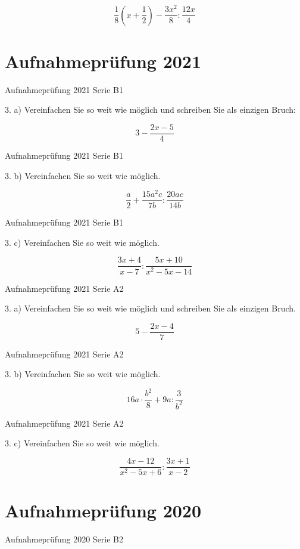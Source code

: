 {$$\frac18\left(x+\frac12\right)  - \frac{3x^2}{8} : \frac{12x}{4}$$

\section*{Aufnahmeprüfung 2021}
Aufnahmeprüfung 2021 Serie B1

3. a) Vereinfachen Sie so weit wie möglich und schreiben Sie als
einzigen Bruch:

$$3-\frac{2x-5}{4}$$

Aufnahmeprüfung 2021 Serie B1

3. b) Vereinfachen Sie so weit wie möglich.

$$\frac{a}2 + \frac{15a^2c}{7b} : \frac{20ac}{14b}$$

Aufnahmeprüfung 2021 Serie B1

3. c) Vereinfachen Sie so weit wie möglich.

$$\frac{3x+4}{x-7} : \frac{5x+10}{x^2-5x-14}$$

Aufnahmeprüfung 2021 Serie A2

3. a) Vereinfachen Sie so weit wie möglich und schreiben Sie als
einzigen Bruch.

$$5-\frac{2x-4}{7}$$

Aufnahmeprüfung 2021 Serie A2

3. b) Vereinfachen Sie so weit wie möglich.

$$16a\cdot{}\frac{b^2}{8} + 9a : \frac{3}{b^2}$$

Aufnahmeprüfung 2021 Serie A2

3. c) Vereinfachen Sie so weit wie möglich.

$$\frac{4x-12}{x^2-5x+6} : \frac{3x+1}{x-2}$$

\section*{Aufnahmeprüfung 2020}
Aufnahmeprüfung 2020 Serie B2

}
